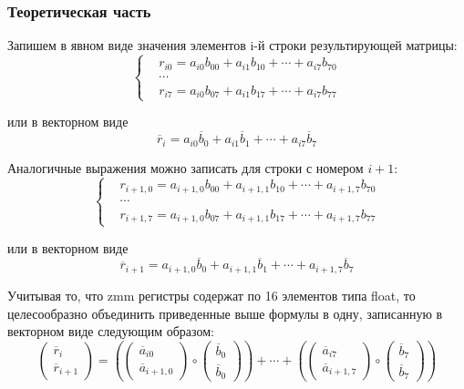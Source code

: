 \subsubsection{Теоретическая часть}

Запишем в явном виде значения элементов i-й строки результирующей матрицы:
\begin{equation}
	\left\{
		\begin{aligned}
			& r_{i0} = a_{i0}b_{00} + a_{i1}b_{10} + \cdots + a_{i7}b_{70} \\
			& \cdots \\
			& r_{i7} = a_{i0}b_{07} + a_{i1}b_{17} + \cdots + a_{i7}b_{77}
		\end{aligned}
	\right.
\end{equation}

или в векторном виде
\begin{equation}
	\overline{r}_i = a_{i0}\overline{b}_0 + a_{i1}\overline{b}_1 + \cdots + a_{i7}\overline{b}_7
\end{equation}

Аналогичные выражения можно записать для строки с номером $i + 1$:
\begin{equation}
	\left\{
		\begin{aligned}
			& r_{i + 1,0} = a_{i + 1,0}b_{00} + a_{i + 1,1}b_{10} + \cdots + a_{i + 1,7}b_{70} \\
			& \cdots \\
			& r_{i + 1,7} = a_{i + 1,0}b_{07} + a_{i + 1,1}b_{17} + \cdots + a_{i + 1,7}b_{77}
		\end{aligned}
	\right.
\end{equation}

или в векторном виде
\begin{equation}
	\overline{r}_{i + 1} = a_{i + 1,0}\overline{b}_0 + a_{i + 1,1}\overline{b}_1 + \cdots + a_{i + 1,7}\overline{b}_7
\end{equation}

Учитывая то, что zmm регистры содержат по 16 элементов типа float, то целесообразно объединить приведенные выше формулы в одну, записанную в векторном виде следующим образом:
\begin{equation}
	\begin{pmatrix}
		\overline{r}_i \\
		\overline{r}_{i + 1}
	\end{pmatrix}
	=
	\left(
		\begin{pmatrix}
			\overline{a}_{i0} \\
			\overline{a}_{i + 1,0}
		\end{pmatrix} \circ
		\begin{pmatrix}
			\overline{b}_0 \\
			\overline{b}_0
		\end{pmatrix}
	\right)
	+ \cdots +
	\left(
		\begin{pmatrix}
			\overline{a}_{i7} \\
			\overline{a}_{i + 1,7}
		\end{pmatrix} \circ
		\begin{pmatrix}
			\overline{b}_7 \\
			\overline{b}_7
		\end{pmatrix}
	\right)
\end{equation}

